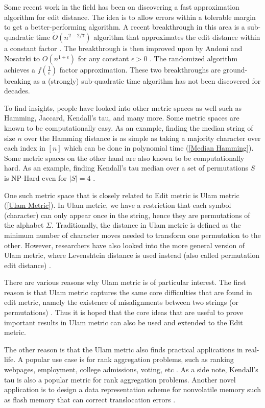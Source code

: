Some recent work in the field has been on discovering a fast approximation algorithm for edit distance. The idea is to allow errors within a tolerable margin to get a better-performing algorithm. A recent breakthrough in this area is a sub-quadratic time $\tilde{O}(n^{2 - 2/7})$ algorithm that approximates the edit distance within a constant factor \cite{QuadraticEdit}. The breakthrough is then improved upon by Andoni and Nosatzki to $O(n^{1 + \epsilon})$ for any constant $\epsilon > 0$ \cite{LinearEdit}. The randomized algorithm achieves a $f(\frac{1}{\epsilon})$ factor approximation. These two breakthroughs are ground-breaking as a (strongly) sub-quadratic time algorithm has not been discovered for decades.

To find insights, people have looked into other metric spaces as well such as Hamming, Jaccard, Kendall's tau, and many more. Some metric spaces are known to be computationally easy. As an example, finding the median string of size $n$ over the Hamming distance is as simple as taking a majority character over each index in $[n]$ which can be done in polynomial time (\ref{Median Hamming}). Some metric spaces on the other hand are also known to be computationally hard. As an example, finding Kendall's tau median over a set of permutations $S$ is NP-Hard even for $|S| = 4$ \cite{KendallHard}.

One such metric space that is closely related to Edit metric is Ulam metric (\ref{Ulam Metric}). In Ulam metric, we have a restriction that each symbol (character) can only appear once in the string, hence they are permutations of the alphabet $\Sigma$. Traditionally, the distance in Ulam metric is defined as the minimum number of character moves needed to transform one permutation to the other. However, researchers have also looked into the more general version of Ulam metric, where Levenshtein distance is used instead (also called permutation edit distance) \cite{PermutationEdit}.

There are various reasons why Ulam metric is of particular interest. The first reason is that Ulam metric captures the same core difficulties that are found in edit metric, namely the existence of misalignments between two strings (or permutations) \cite{NearOptimalUlam}. Thus it is hoped that the core ideas that are useful to prove important results in Ulam metric can also be used and extended to the Edit metric.  

The other reason is that the Ulam metric also finds practical applications in real-life. A popular use case is for rank aggregation problems, such as ranking webpages, employment, college admissions, voting, etc \cite{FairRankAggregation, RankData}. As a side note, Kendall's tau is also a popular metric for rank aggregation problems. Another novel application is to design a data representation scheme for nonvolatile memory such as flash memory that can correct translocation errors \cite{MultiPermutation, FlashMemory, ChargeDropCorrection}.

